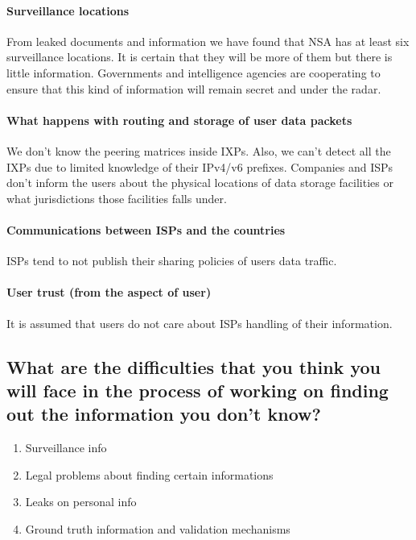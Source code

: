\paragraph{Surveillance locations}
From leaked documents and information we have found that NSA has at least six 
surveillance locations. It is certain that they will be more of them but there 
is little information. Governments and intelligence agencies are cooperating to 
ensure that this kind of information will remain secret and under the radar.

\paragraph{What happens with routing and storage of user data packets}
We don't know the peering matrices inside IXPs. Also, we can't detect all the 
IXPs due to limited knowledge of their IPv4/v6 prefixes.
Companies and ISPs don't inform the users about the physical locations of data 
storage facilities or what jurisdictions those facilities falls under.

\paragraph{Communications between ISPs and the countries}
ISPs tend to not publish their sharing policies of users data traffic.

\paragraph{User trust (from the aspect of user)}
It is assumed that users do not care about ISPs handling of their information.

\subsection{What are the difficulties that you think you will face in the 
process of working on finding out the information you don't know?}

\begin{enumerate}
\item Surveillance info
\item Legal problems about finding certain informations
\item Leaks on personal info
\item Ground truth information and validation mechanisms
\end{enumerate}
